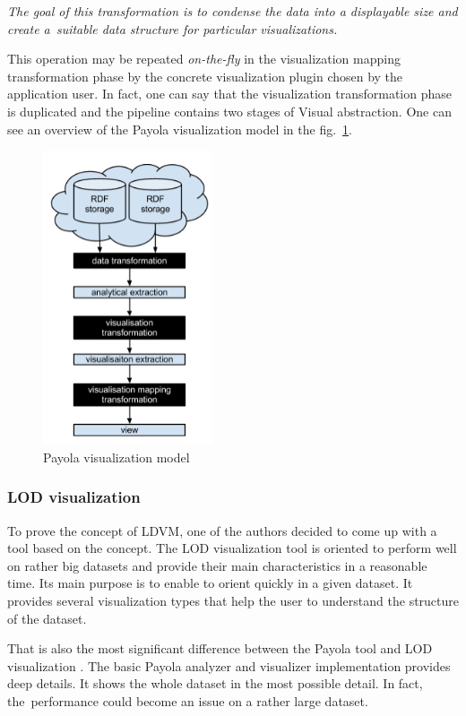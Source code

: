 \emph{The goal of this transformation is to condense the data into a displayable size and create
a~suitable data structure for particular visualizations.}

This operation may be repeated \emph{on-the-fly} in the visualization mapping transformation
phase by the concrete visualization plugin chosen by the application user. In fact, one can
say that the visualization transformation phase is duplicated and the pipeline contains two
stages of Visual abstraction. One can see an overview of the Payola 
visualization model in the fig.~\ref{fig:payola_model}.

\begin{figure}
	\centering
	\includegraphics[width=50mm]{img/payola_model.png}
	\caption{Payola visualization model}
	\label{fig:payola_model}
\end{figure}

\subsubsection{LOD visualization }
To prove the concept of LDVM, one of the authors decided to come up with a tool 
based on the concept. The LOD visualization tool is oriented to perform well on rather big datasets and 
provide their main characteristics in a reasonable time. Its main purpose is to 
enable to orient quickly in a given dataset. It provides several 
visualization types that help the user to understand the structure of the 
dataset.

That is also the most significant difference between the Payola tool and LOD 
visualization . The basic Payola analyzer and visualizer implementation provides 
deep details. It shows the whole dataset in the most possible detail. In fact, 
the~performance could become an issue on a rather large dataset.

